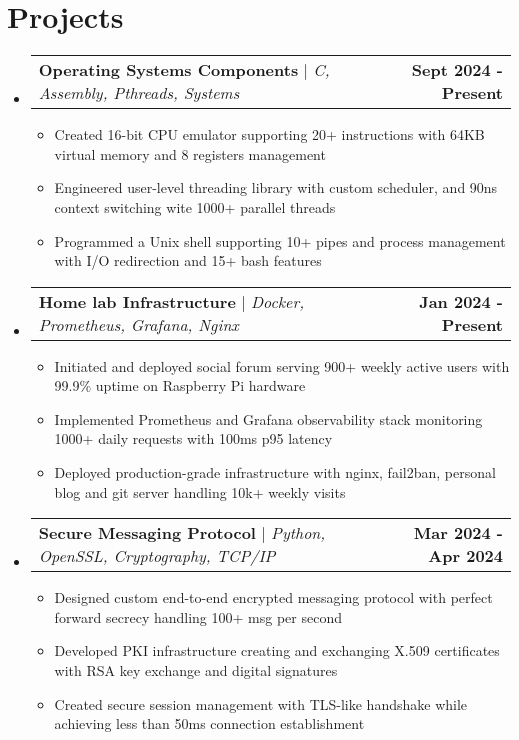 \documentclass[letterpaper,11pt]{article}
\makeatletter
\newcommand{\preSecSpace}{-10pt}
\newcommand{\postItemSpace}{-10pt}
\newcommand{\preItemSpace}{-10pt}
\newcommand{\itemspace}{-5pt}
\newcommand{\preSecVSpace}{\vspace{\preSecSpace}}
\newcommand{\postItemVSpace}{\vspace{\postItemSpace}}
\newcommand{\itemVSpace}{\vspace{\itemspace}}
\newcommand{\expHeader}[4]{
    \item
    \begin{tabular*}{\textwidth}
        {l@{\extracolsep{\fill}}r}
        #1 & #2 \\
        #3 & #4 \\
    \end{tabular*}
    \itemVSpace
}
\newcommand{\projHeader}[2]{
    \item
    \begin{tabular*}{\textwidth}
        {l@{\extracolsep{\fill}}r}
        #1 & #2 \\
    \end{tabular*}
    \postItemVSpace
}
\newcommand{\resumeItem}[1]{
  \item\small{#1}
}
\newcommand{\sectionStart}{
    \begin{itemize}[
        leftmargin=0pt,
        label={},
        topsep=\preItemSpace,    %
        itemsep=2pt,   %
    ]
}
\newcommand{\sectionEnd}{
    \end{itemize}
}
\newcommand{\bulletStart}{
    \begin{itemize}[
        leftmargin=15pt,
        label={$\circ$},  %
        topsep=\preItemSpace,    %
        itemsep=0pt,   %
    ]
}
\newcommand{\bulletEnd}{
    \end{itemize}
}
\makeatother
\begin{document}
\section{Projects}
    \sectionStart
    \projHeader {\textbf{Operating Systems Components} $|$ \textit{C, Assembly, Pthreads, Systems} } {\textbf{\small{Sept 2024 - Present}}}
        \bulletStart
            \resumeItem{Created 16-bit CPU emulator supporting 20+ instructions with 64KB virtual memory and 8 registers management}
            \resumeItem{Engineered user-level threading library with custom scheduler, and 90ns context switching wite 1000+ parallel threads}
            \resumeItem{Programmed a Unix shell supporting 10+ pipes and process management with I/O redirection and 15+ bash features}
        \bulletEnd

    \projHeader {\textbf{Home lab Infrastructure} $|$ \textit{Docker, Prometheus, Grafana, Nginx}} {\textbf{\small{Jan 2024 - Present}}}
        \bulletStart
            \resumeItem{Initiated and deployed social forum serving 900+ weekly active users with 99.9\% uptime on Raspberry Pi hardware}
            \resumeItem{Implemented Prometheus and Grafana observability stack monitoring 1000+ daily requests with 100ms p95 latency}
            \resumeItem{Deployed production-grade infrastructure with nginx, fail2ban, personal blog and git server handling 10k+ weekly visits}
        \bulletEnd

    \projHeader {\textbf{Secure Messaging Protocol} $|$ {\textit{Python, OpenSSL, Cryptography, TCP/IP}}}  {\textbf{\small{Mar 2024 - Apr 2024}}}
        \bulletStart
            \resumeItem{Designed custom end-to-end encrypted messaging protocol with perfect forward secrecy handling 100+ msg per second}
            \resumeItem{Developed PKI infrastructure creating and exchanging X.509 certificates with RSA key exchange and digital signatures}
            \resumeItem{Created secure session management with TLS-like handshake while achieving less than 50ms connection establishment}
        \bulletEnd



    \sectionEnd
\end{document}
